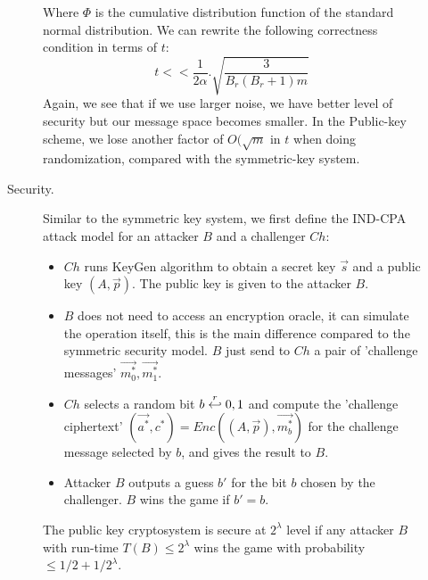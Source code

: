 \begin{description}
\begin{description}
                    Where $\Phi$ is the cumulative distribution function of the
                    standard normal distribution. We can rewrite the following
                    correctness condition in terms of $t$:
                    \[
                        t << \frac{1}{2\alpha}.\sqrt{\frac{3}{B_r(B_r + 1)m}}
                    \]
                    Again, we see that if we use larger noise, we have better
                    level of security but our message space becomes smaller. In
                    the Public-key scheme, we lose another factor of
                    $O(\sqrt{m}$ in $t$ when doing
                    randomization, compared with the symmetric-key system.
                \item [Security.] Similar to the symmetric key system, we first define the IND-CPA attack
                    model for an attacker $B$ and a challenger $Ch$:
                    \begin{itemize}
                        \item $Ch$ runs KeyGen algorithm to obtain a secret key
                            $\vec{s}$ and a public key $(A,\vec{p})$. The public
                            key is given to the attacker $B$.
                        \item $B$ does not need to access an encryption oracle,
                            it can simulate the operation itself, this is the
                            main difference compared to the symmetric security
                            model. $B$ just send
                            to $Ch$ a pair of 'challenge messages'
                            $\vec{m_0^*}, \vec{m_1^*}$.
                        \item $Ch$ selects a random bit $b \stackrel{r}{\hookleftarrow}
                            {0,1}$ and compute the 'challenge ciphertext'
                            $(\vec{a^*}, c^*) = Enc((A, \vec{p}), \vec{m_b^*})$
                            for the challenge message selected by $b$, and gives
                            the result to $B$.
                        \item Attacker $B$ outputs a guess $b'$ for the bit
                            $b$ chosen by the challenger. $B$ wins the game if
                            $b' = b$.
                    \end{itemize}
                    \begin{definition}
                         The public key cryptosystem is
                        secure at $2^\lambda$ level if any attacker $B$ with
                        run-time $T(B) \leq 2^\lambda$ wins the game with
                        probability $\leq 1/2 + 1/2^\lambda$.


\end{definition}
\end{description}
\end{description}
